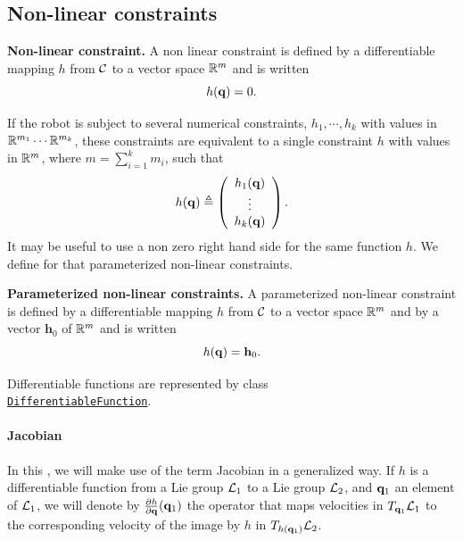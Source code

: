 \subsection{Non-linear constraints}

\begin{definition}\textbf{Non-linear constraint.} A non linear constraint is defined by a differentiable mapping $h$ from $\mathcal{C}$ to a vector space $\mathbb{R}^m$ and is written
\begin{equation}\label{eq:constraint}
h(\conf) = 0.
\end{equation}
\end{definition}
If the robot is subject to several numerical constraints, $h_1,\cdots,h_k$ with values in $\mathbb{R}^{m_1}\cdots\mathbb{R}^{m_k}$, these constraints are equivalent to a single constraint $h$ with values in $\mathbb{R}^{m}$, where $m=\sum_{i=1}^k m_i$, such that
$$
h(\mathbf{q}) \triangleq \left(\begin{array}{c} h_1(\mathbf{q}) \\ \vdots \\ h_k(\mathbf{q})
\end{array}\right).
$$
It may be useful to use a non zero right hand side for the same function $h$. We define for that parameterized non-linear constraints.
\begin{definition}\textbf{Parameterized non-linear constraints.}
  A parameterized non-linear constraint is defined by a differentiable mapping $h$ from $\mathcal{C}$ to a vector space $\mathbb{R}^m$ and by a vector $\mathbf{h}_0$ of $\mathbb{R}^m$ and is written
  $$
  h(\mathbf{q}) = \mathbf{h}_0.
  $$
\end{definition}
Differentiable functions are represented by class\\ \href{https://gepettoweb.laas.fr/hpp/hpp-constraints/doxygen-html/classhpp_1_1constraints_1_1DifferentiableFunction.html}{\texttt{DifferentiableFunction}}.

\paragraph{Jacobian}

In this \paper, we will make use of the term Jacobian in a generalized way.
If $h$ is a differentiable function from a Lie group $\mathcal{L}_1$ to a Lie group $\mathcal{L}_2$, and $\mathbf{q}_1$ an element of $\mathcal{L}_1$, we will denote by $\frac{\partial h}{\partial\mathbf{q}}(\mathbf{q}_1)$ the operator that maps velocities in $T_{\mathbf{q}_1}\mathcal{L}_1$ to the corresponding velocity of the image by $h$ in $T_{h(\mathbf{q}_1)}\mathcal{L}_2$.

